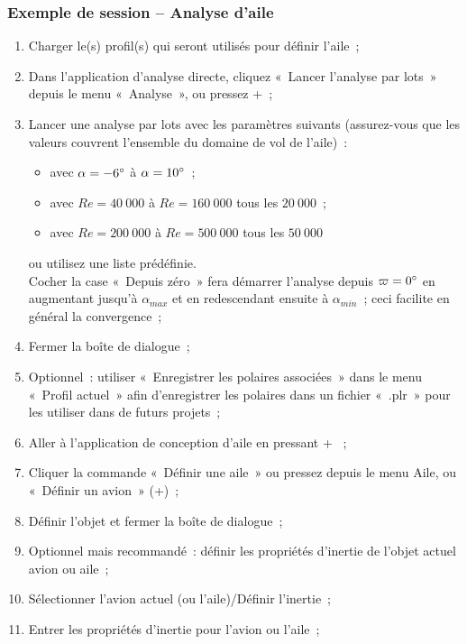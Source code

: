 \documentclass[a4paper,twoside,12pt,dvips]{article}
\begin{document}
\clearpage

\subsubsection{Exemple de session – Analyse d’aile}
\label{section : exemple session analyse aile}

\begin{enumerate}
	\item Charger le(s) profil(s) qui seront utilisés pour définir l’aile~;
	\item Dans l’application d’analyse directe, cliquez «~Lancer l’analyse par 
	lots~» depuis le menu «~Analyse~», ou pressez +~;
	\item Lancer une analyse par lots avec les paramètres suivants (assurez-vous 
	que les valeurs couvrent l’ensemble du domaine de vol de l’aile)~:
	\begin{itemize}
		\item avec $\alpha = -6\degree$ à $\alpha = 10\degree$~;
		\item avec $Re = 40~000$ à $Re = 160~000$ tous les $20~000$~;
		\item avec $Re = 200~000$ à $Re = 500~000$ tous les $50~000$
	\end{itemize}
	ou utilisez une liste prédéfinie.\\
	Cocher la case «~Depuis zéro~» fera démarrer l’analyse depuis $\varpi =
	0\degree$ en augmentant jusqu’à $\alpha_{max}$ et en redescendant ensuite à
	$\alpha_{min}$~; ceci facilite en général la convergence~;
	\item Fermer la boîte de dialogue~;
	\item Optionnel~: utiliser «~Enregistrer les polaires associées~» dans le
	menu «~Profil actuel~» afin d’enregistrer les polaires dans un fichier
	«~.plr~» pour les utiliser dans de futurs projets~;
	\item Aller à l’application de conception d’aile en pressant +
	~;
	\item Cliquer la commande «~Définir une aile~» ou pressez  depuis
	le menu Aile, ou «~Définir un avion~» (+)~;
	\item Définir l’objet et fermer la boîte de dialogue~;
	\item Optionnel mais recommandé~: définir les propriétés d’inertie de 
	l’objet actuel avion ou aile~;
	\item Sélectionner l’avion actuel (ou l’aile)/Définir l’inertie~;
	\item Entrer les propriétés d’inertie pour l’avion ou l’aile~;

\end{enumerate}
\end{document}
